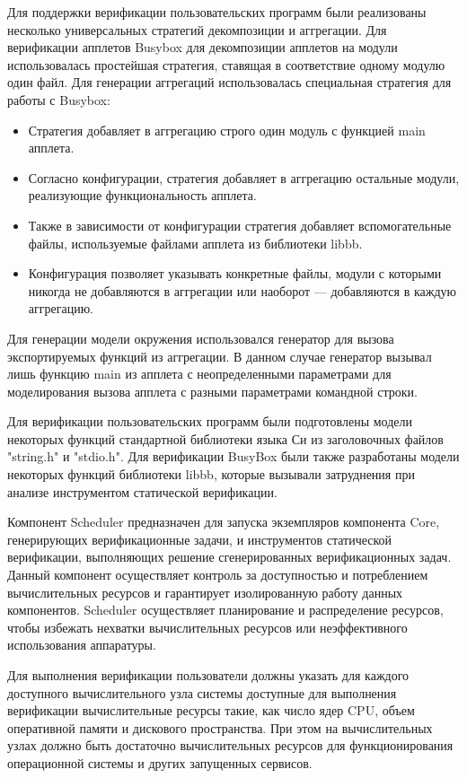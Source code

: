 \documentclass[%
candidate,     %
href,        %
colorlinks,  %
]{disser}
\begin{document}
Для поддержки верификации пользовательских программ были реализованы несколько универсальных стратегий декомпозиции и аггрегации.
Для верификации апплетов Busybox для декомпозиции апплетов на модули использовалась простейшая стратегия, ставящая в соответствие одному модулю один файл.
Для генерации аггрегаций использовалась специальная стратегия для работы с Busybox:
\begin{itemize}
    \item Стратегия добавляет в аггрегацию строго один модуль с функцией main апплета.
    \item Согласно конфигурации, стратегия добавляет в аггрегацию остальные модули, реализующие функциональность апплета.
    \item Также в зависимости от конфигурации стратегия добавляет вспомогательные файлы, используемые файлами апплета из библиотеки libbb.
    \item Конфигурация позволяет указывать конкретные файлы, модули с которыми никогда не добавляются в аггрегации или наоборот --- добавляются в каждую аггрегацию.
\end{itemize}

Для генерации модели окружения использовался генератор для вызова экспортируемых функций из аггрегации.
В данном случае генератор вызывал лишь функцию main из апплета с неопределенными параметрами для моделирования вызова апплета с разными параметрами командной строки.

Для верификации пользовательских программ были подготовлены модели некоторых функций стандартной библиотеки языка Си из заголовочных файлов "string.h" и "stdio.h".
Для верификации BusyBox были также разработаны модели некоторых функций библиотеки libbb, которые вызывали затруднения при анализе инструментом статической верификации.


Компонент Scheduler предназначен для запуска экземпляров компонента Core, генерирующих верификационные задачи, и инструментов статической верификации, выполняющих решение сгенерированных верификационных задач.
Данный компонент осуществляет контроль за доступностью и потреблением вычислительных ресурсов и гарантирует изолированную работу данных компонентов.
Scheduler осуществляет планирование и распределение ресурсов, чтобы избежать нехватки вычислительных ресурсов или неэффективного использования аппаратуры.

Для выполнения верификации пользователи должны указать для каждого доступного вычислительного узла системы доступные для выполнения верификации вычислительные ресурсы такие, как число ядер CPU, объем оперативной памяти и дискового пространства.
При этом на вычислительных узлах должно быть достаточно вычислительных ресурсов для функционирования операционной системы и других запущенных сервисов.
\end{document}
